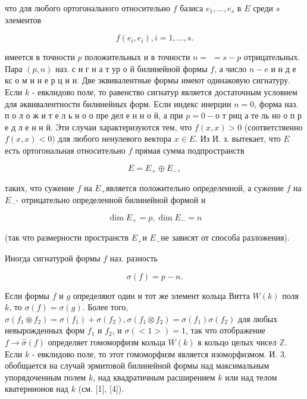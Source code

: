 \documentclass[10pt]{article}
\begin{document}
что для любого ортогонального относительно $f$ базиса $e_{1}, \ldots, e_{s}$ в $E$ среди $s$ элементов



\[

f\left(e_{i}, e_{i}\right), i=1, \ldots, s .

\]



имеется в точности $p$ положительных и в точности $n=$ $=s-p$ отрицательных. Пара $(p, n)$ наз. с и г н а т ур о й билинейной формы $f$, а число $n-\mathrm{e}$ и н д е кс о м и н е р ц и и. Две эквивалентные формы имеют одинаковую сигнатуру. Если $k$ - евклидово поле, то равенство сигнатур является достаточным условием для әквивалентности билинейных форм. Если индекс инерции $n=0$, форма наз. п о л о ж и т е л ь н о о пре дел е н н о й, а при $p=0-о$ т риц а те ль но о п р е д л е н н й. Эти случаи характеризуются тем, что $f(x, x)>0$ (соответственно $f(x, x)<0)$ для любого ненулевого вектора $x \in E$. Из И. з. вытекает, что $E$ есть ортогональная относительно $f$ прямая сумма подпространств



\[

E=E_{+} \oplus E_{-},

\]



таких, что сужение $f$ на $E_{+}$является положительно определенной, а сужение $f$ на $E_{-}$- отрицательно определенной билинейной формой и



\[

\operatorname{dim} E_{+}=p, \operatorname{dim} E_{-}=n

\]



(так что размерности пространств $E_{+}$и $E_{-}$не зависят от способа разложения).



Иногда сигнатурой формы $f$ наз. разность



\[

\sigma(f)=p-n .

\]



Если формы $f$ и $g$ определяют один и тот же элемент кольца Витта $W(k)$ поля $k$, то $\sigma(f)=\sigma(g)$. Более того, $\sigma\left(f_{1} \circledast f_{2}\right)=\sigma\left(f_{1}\right)+\sigma\left(f_{2}\right), \sigma\left(f_{1} \otimes f_{2}\right)=\sigma\left(f_{1}\right) \sigma\left(f_{2}\right)$ для любых невырожденных форм $f_{1}$ и $f_{2}$, и $\sigma(<1>)=1$, так что отображение $f \rightarrow \hat{\sigma}(f)$ определяет гомоморфизм кольца $W(k)$ в кольцо целых чисел $\mathbb{Z}$. Если $k$ - евклидово поле, то этот гомоморфизм является изоморфизмом. И. 3. обобщается на случай эрмитовой билинейной формы над максимальным упорядоченным полем $k$, над квадратичным расширением $k$ или над телом кватернионов над $k$ (см. [1], [4]).
\end{document}
